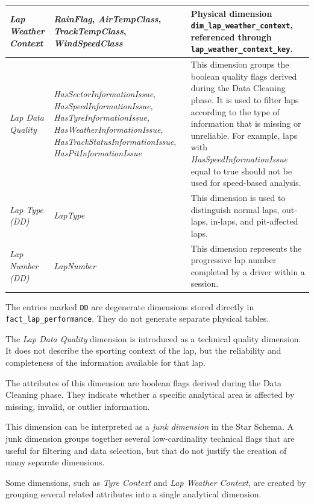 \documentclass[a4paper,11pt]{article}
\begin{document}
\begin{longtable}{|p{2.7cm}|p{5.3cm}|p{6.8cm}|}
		\textit{Lap Weather Context}
		& \textit{RainFlag}, \textit{AirTempClass}, \textit{TrackTempClass}, \textit{WindSpeedClass}
		& Physical dimension \texttt{dim\_lap\_weather\_context}, referenced through
		\texttt{lap\_weather\_context\_key}. \\
		\hline
		
		\textit{Lap Data Quality}
		& \textit{HasSectorInformationIssue}, \textit{HasSpeedInformationIssue},
		\textit{HasTyreInformationIssue}, \textit{HasWeatherInformationIssue},
		\textit{HasTrackStatusInformationIssue}, \textit{HasPitInformationIssue}
		& This dimension groups the boolean quality flags derived during the Data Cleaning phase.
		It is used to filter laps according to the type of information that is missing or unreliable.
		For example, laps with \textit{HasSpeedInformationIssue} equal to true should not be used for speed-based analysis. \\
		\hline
		
		
		\textit{Lap Type (DD)}
		& \textit{LapType}
		& This dimension is used to distinguish normal laps, out-laps, in-laps, and pit-affected laps. \\
		\hline
		
		\textit{Lap Number (DD)}
		& \textit{LapNumber}
		& This dimension represents the progressive lap number completed by a driver within a session.  \\
		\hline
		
	\end{longtable}

	The entries marked \texttt{DD} are degenerate dimensions stored directly in
	\texttt{fact\_lap\_performance}. They do not generate separate physical tables.
	
	The \textit{Lap Data Quality} dimension is introduced as a technical quality dimension.
	It does not describe the sporting context of the lap, but the reliability and completeness
	of the information available for that lap.
	
	The attributes of this dimension are boolean flags derived during the Data Cleaning phase.
	They indicate whether a specific analytical area is affected by missing, invalid, or
	outlier information.
	
	This dimension can be interpreted as a \textit{junk dimension} in the Star Schema.
	A junk dimension groups together several low-cardinality technical flags that are useful
	for filtering and data selection, but that do not justify the creation of many separate
	dimensions.

	Some dimensions, such as \textit{Tyre Context} and \textit{Lap Weather Context}, are created by
	grouping several related attributes into a single analytical dimension.
	
\end{document}

